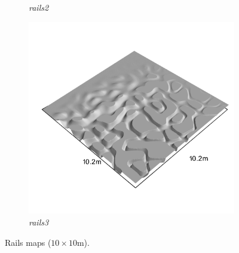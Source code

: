 \documentclass[../document.tex]{subfiles}
\begin{document}
\begin{figure}[H]
\begin{subfigure}[b]{0.32\linewidth}
            \caption{\emph{rails2}}
            \end{subfigure}    
          \begin{subfigure}[b]{0.32\textwidth}
            \includegraphics[width=\textwidth]{../img/hm3d_borders/rails3.png}
            \caption{\emph{rails3}}
        \end{subfigure}    
    \caption{Rails maps ($10\times10$m).}
\end{figure}
\end{document}

